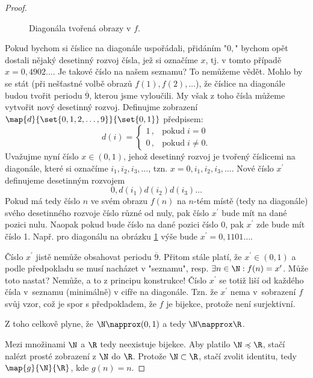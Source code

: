 \begin{proof}
\begin{figure}[H]
        \caption{Diagonála tvořená obrazy v $f$.}
        \label{fig:diagonala_realna_a_prirozena_cisla}
    \end{figure}
    Pokud bychom si číslice na diagonále uspořádali, přidáním "$0,$" bychom opět dostali nějaký desetinný rozvoj čísla, jež si označíme $x$, tj. v tomto případě $x=0,4902\dots$. Je takové číslo na našem seznamu? To nemůžeme vědět. Mohlo by se stát (při nešťastné volbě obrazů $f(1),f(2),\dots$), že číslice na diagonále budou tvořit periodu $\overline{9}$, kterou jsme vyloučili. My však z toho čísla můžeme vytvořit nový desetinný rozvoj. Definujme zobrazení $\map{d}{\set{0,1,2,\dots,9}}{\set{0,1}}$ předpisem:
    \begin{equation*}
        d(i)=\left\{
        \begin{array}{ll}
            1\,, & \text{pokud}\;i=0\\
            0\,, & \text{pokud}\;i\neq 0.
        \end{array}
        \right.
    \end{equation*}
    Uvažujme nyní číslo $x\in(0,1)$, jehož desetinný rozvoj je tvořený číslicemi na diagonále, které si označíme $i_1,i_2,i_3,\dots$, tzn. $x=0,i_1,i_2,i_3,\dots$. Nové číslo $x^\prime$ definujeme desetinným rozvojem
    \begin{equation*}
        0,d(i_1)d(i_2)d(i_3)\dots
    \end{equation*}
    Pokud má tedy číslo $n$ ve svém obrazu $f(n)$ na $n$-tém místě (tedy na diagonále) svého desetinného rozvoje číslo různé od nuly, pak číslo $x^\prime$ bude mít na dané pozici nulu. Naopak pokud bude číslo na dané pozici číslo 0, pak $x^\prime$ zde bude mít číslo 1. Např. pro diagonálu na obrázku \ref{fig:diagonala_realna_a_prirozena_cisla} výše bude $x^\prime=0,1101\dots$.\par
    Číslo $x^\prime$ jistě nemůže obsahovat periodu $\overline{9}$. Přitom stále platí, že $x^\prime\in(0,1)$ a podle předpokladu se musí nacházet v "seznamu", resp. $\exists n\in\N: f(n)=x^\prime$. Může toto nastat? Nemůže, a to z principu konstrukce! Číslo $x^\prime$ se totiž liší od každého čísla v~seznamu (minimálně) v cifře na diagonále. Tzn. že $x^\prime$ nema v~sobrazení $f$ svůj vzor, což je spor s předpokladem, že $f$ je bijekce, protože není surjektivní.\par
    Z toho celkově plyne, že $\N\napprox(0,1)$ a tedy $\N\napprox\R$.
    \medskip

    Mezi množinami $\N$ a $\R$ tedy neexistuje bijekce. Aby platilo $\N\preccurlyeq\R$, stačí nalézt prosté zobrazení z $\N$ do $\R$. Protože $\N\subset\R$, stačí zvolit identitu, tedy $\map{g}{\N}{\R}$, kde $g(n)=n$.
\end{proof}
